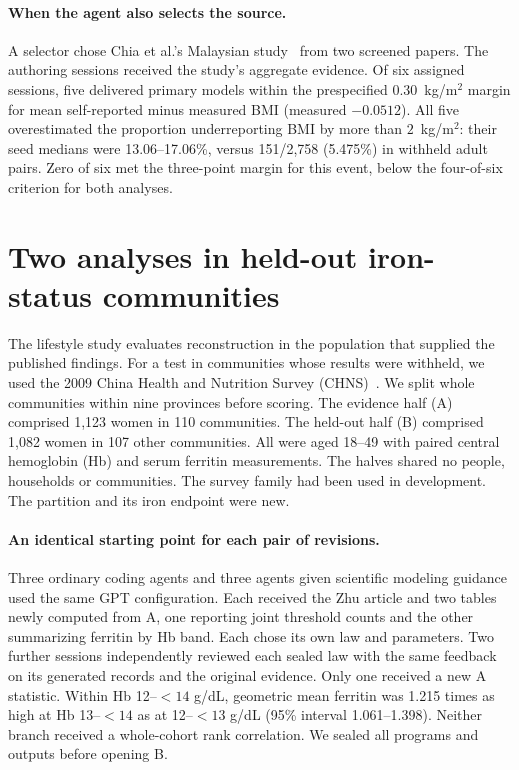 \documentclass[sigconf,anonymous,review]{acmart}
\begin{document}
\paragraph{When the agent also selects the source.}
A selector chose Chia et al.'s Malaysian study~\cite{chiamalaysia} from two screened papers. The authoring sessions received the study's aggregate evidence. Of six assigned sessions, five delivered primary models within the prespecified $0.30$~kg/m$^2$ margin for mean self-reported minus measured BMI (measured $-0.0512$). All five overestimated the proportion underreporting BMI by more than $2$~kg/m$^2$: their seed medians were 13.06--17.06\%, versus 151/2,758 (5.475\%) in withheld adult pairs. Zero of six met the three-point margin for this event, below the four-of-six criterion for both analyses.

\section{Two analyses in held-out iron-status communities}
\label{sec:chns}
The lifestyle study evaluates reconstruction in the population that supplied the published findings. For a test in communities whose results were withheld, we used the 2009 China Health and Nutrition Survey (CHNS)~\cite{chnsbio,chnsind}. We split whole communities within nine provinces before scoring. The evidence half (A) comprised 1,123 women in 110 communities. The held-out half (B) comprised 1,082 women in 107 other communities. All were aged 18--49 with paired central hemoglobin (Hb) and serum ferritin measurements. The halves shared no people, households or communities. The survey family had been used in development. The partition and its iron endpoint were new.

\paragraph{An identical starting point for each pair of revisions.}
Three ordinary coding agents and three agents given scientific modeling guidance used the same GPT configuration. Each received the Zhu article and two tables newly computed from A, one reporting joint threshold counts and the other summarizing ferritin by Hb band. Each chose its own law and parameters. Two further sessions independently reviewed each sealed law with the same feedback on its generated records and the original evidence. Only one received a new A statistic. Within Hb 12--$<14$ g/dL, geometric mean ferritin was 1.215 times as high at Hb 13--$<14$ as at 12--$<13$ g/dL (95\% interval 1.061--1.398). Neither branch received a whole-cohort rank correlation. We sealed all programs and outputs before opening B.
\end{document}
